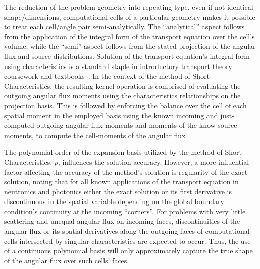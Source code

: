 The reduction of the problem geometry into repeating-type, even if not identical-shape/dimensions, computational cells of a particular geometry makes it possible to treat each cell/angle pair semi-analytically.
The “analytical” aspect follows from the application of the integral form of the transport equation over the cell’s volume, while the “semi” aspect follows from the stated projection of the angular flux and source distributions.
Solution of the transport equation’s integral form using characteristics is a standard staple in introductory transport theory coursework and textbooks~\cite{Lewis1993}.
In the context of the method of Short Characteristics, the resulting kernel operation is comprised of evaluating the outgoing angular flux moments using the characteristics relationships on the projection basis.
This is followed by enforcing the balance over the cell of each spatial moment in the employed basis using the known incoming and just-computed outgoing angular flux moments and moments of the know source moments, to compute the cell-moments of the angular flux~\cite{Sanchez1982}.

The polynomial order of the expansion basis utilized by the method of Short Characteristics, $p$, influences the solution accuracy.
However, a more influential factor affecting the accuracy of the method’s solution is regularity of the exact solution, noting that for all known applications of the transport equation in neutronics and photonics either the exact solution or its first derivative is discontinuous in the spatial variable depending on the global boundary condition’s continuity at the incoming “corners”.
For problems with very little scattering and unequal angular flux on incoming faces, discontinuities of the angular flux or its spatial derivatives along the outgoing faces of computational cells intersected by singular characteristics are expected to occur.
Thus, the use of a continuous polynomial basis will only approximately capture the true shape of the angular flux over such cells’ faces.

